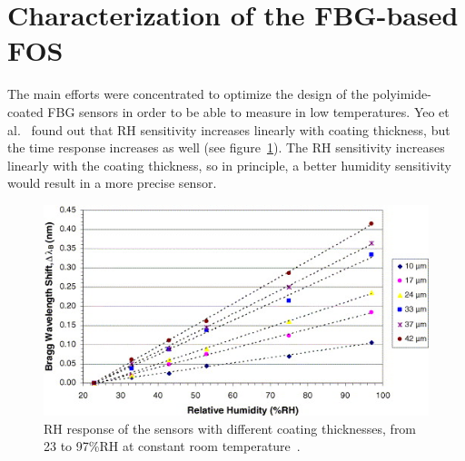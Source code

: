 \section{Characterization of the FBG-based FOS}
The main efforts were concentrated to optimize the design of the polyimide-coated FBG sensors in order to be able to measure in low temperatures. Yeo et al.~\cite{YEO_PI} found out that \gls{RH} sensitivity increases linearly with coating thickness, but the time response increases as well (see figure~\ref{fig:yeo}). The \gls{RH} sensitivity increases linearly with the coating thickness, so in principle, a better humidity sensitivity would result in a more precise sensor.

\begin{figure}[!h]
\centering
\includegraphics[width=0.80\columnwidth]{Chapter5/images/yeo_coating.jpg}
\caption{RH response of the sensors with different coating thicknesses, from 23 to 97\%RH at constant room temperature~\cite{YEO_PI}.}
\label{fig:yeo}
\end{figure}

